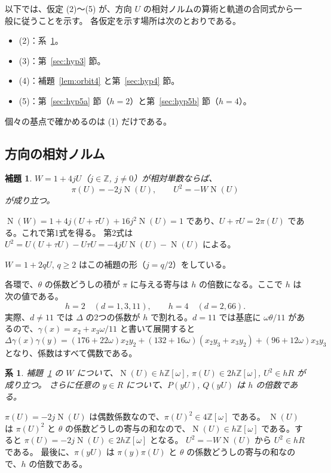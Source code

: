 \documentclass[a4paper,11pt]{ltjsarticle}
\makeatletter
\theoremstyle{jplain}
\newtheorem{lemma}[theorem]{補題}
\newtheorem{corollary}[theorem]{系}
\renewcommand{\proofname}{証明}
\renewenvironment{proof}[1][\proofname]{\par\pushQED{\qed}\normalfont\topsep6\p@\@plus6\p@\relax
  \trivlist\item[\hskip\labelsep\bfseries #1]\ignorespaces}{\popQED\endtrivlist\@endpefalse}
\numberwithin{equation}{section}
\numberwithin{table}{section}
\newcommand{\Z}{\mathbb{Z}}
\newcommand{\Nm}{\operatorname{N}}
\makeatother
\begin{document}
以下では、仮定 (2)〜(5) が、方向 $U$ の相対ノルムの算術と軌道の合同式から一般に従うことを示す。
各仮定を示す場所は次のとおりである。
\begin{itemize}
\item (2)：系~\ref{cor:width}。
\item (3)：第~\ref{sec:hyp3} 節。
\item (4)：補題~\ref{lem:orbit4} と第~\ref{sec:hyp4} 節。
\item (5)：第~\ref{sec:hyp5a} 節（$h=2$）と第~\ref{sec:hyp5b} 節（$h=4$）。
\end{itemize}
個々の基点で確かめるのは (1) だけである。

\subsection{方向の相対ノルム}

\begin{lemma}\label{lem:direction}
$W=1+4jU$（$j\in\Z$, $j\ne0$）が相対単数ならば、
\[
\pi(U)=-2j\Nm(U),\qquad U^2=-W\Nm(U)
\]
が成り立つ。
\end{lemma}

\begin{proof}
$\Nm(W)=1+4j(U+\tau U)+16j^2\Nm(U)=1$ であり、$U+\tau U=2\pi(U)$ である。これで第1式を得る。
第2式は $U^2=U(U+\tau U)-U\tau U=-4jU\Nm(U)-\Nm(U)$ による。
\end{proof}

$W=1+2qU$, $q\ge2$ はこの補題の形（$j=q/2$）をしている。

各環で、$\theta$ の係数どうしの積が $\pi$ に与える寄与は $h$ の倍数になる。ここで $h$ は次の値である。
\[
h=2\quad(d=1,3,11),\qquad h=4\quad(d=2,66).
\]
実際、$d\ne11$ では $\Delta$ の2つの係数が $h$ で割れる。$d=11$ では基底に $\omega\theta/11$ があるので、$\gamma(x)=x_2+x_3\omega/11$ と書いて展開すると
\[
\Delta\gamma(x)\gamma(y)=(176+22\omega)x_2y_2+(132+16\omega)(x_2y_3+x_3y_2)+(96+12\omega)x_3y_3
\]
となり、係数はすべて偶数である。

\begin{corollary}\label{cor:width}
補題~\ref{lem:direction} の $W$ について、$\Nm(U)\in h\Z[\omega]$, $\pi(U)\in2h\Z[\omega]$, $U^2\in hR$ が成り立つ。
さらに任意の $y\in R$ について、$P(yU)$, $Q(yU)$ は $h$ の倍数である。
\end{corollary}

\begin{proof}
$\pi(U)=-2j\Nm(U)$ は偶数係数なので、$\pi(U)^2\in4\Z[\omega]$ である。
$\Nm(U)$ は $\pi(U)^2$ と $\theta$ の係数どうしの寄与の和なので、$\Nm(U)\in h\Z[\omega]$ である。すると $\pi(U)=-2j\Nm(U)\in2h\Z[\omega]$ となる。
$U^2=-W\Nm(U)$ から $U^2\in hR$ である。
最後に、$\pi(yU)$ は $\pi(y)\pi(U)$ と $\theta$ の係数どうしの寄与の和なので、$h$ の倍数である。
\end{proof}
\end{document}
